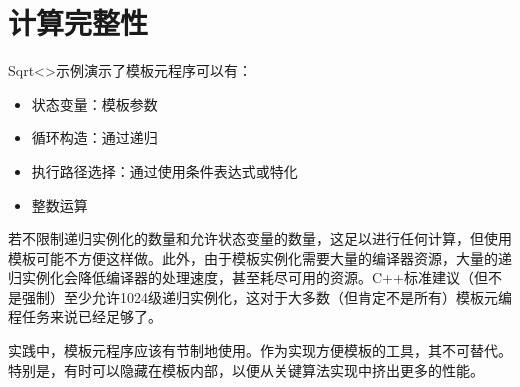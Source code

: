 \section{计算完整性}
Sqrt<>示例演示了模板元程序可以有：

\begin{itemize}
\item 
状态变量：模板参数

\item 
循环构造：通过递归

\item 
执行路径选择：通过使用条件表达式或特化

\item 
整数运算
\end{itemize}

若不限制递归实例化的数量和允许状态变量的数量，这足以进行任何计算，但使用模板可能不方便这样做。此外，由于模板实例化需要大量的编译器资源，大量的递归实例化会降低编译器的处理速度，甚至耗尽可用的资源。C++标准建议（但不是强制）至少允许1024级递归实例化，这对于大多数（但肯定不是所有）模板元编程任务来说已经足够了。

实践中，模板元程序应该有节制地使用。作为实现方便模板的工具，其不可替代。特别是，有时可以隐藏在模板内部，以便从关键算法实现中挤出更多的性能。














































